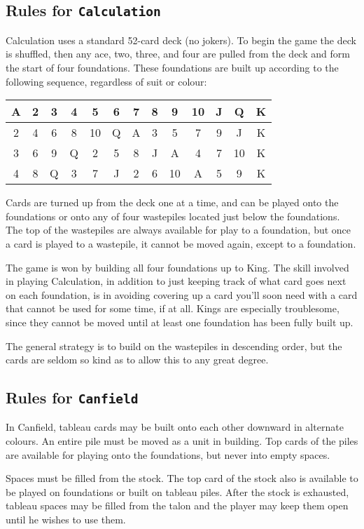 \subsection{Rules for {\tt Calculation}}
Calculation uses a standard 52-card deck (no jokers).
To begin the game the deck is shuffled, then any ace,
two, three, and four are pulled from the deck and form
the start of four foundations.  These foundations are
built up according to the following sequence,
regardless of suit or colour:

\smallskip
\begin{tabular}{|c|c|c|c|c|c|c|c|c|c|c|c|c|}
\hline
            A&2&3&4&5&6&7&8&9&10&J&Q&K\\
\hline
            2&4&6&8&10&Q&A&3&5&7&9&J&K\\
\hline
            3&6&9&Q&2&5&8&J&A&4&7&10&K\\
\hline
            4&8&Q&3&7&J&2&6&10&A&5&9&K\\
\hline
\end{tabular}

\smallskip
Cards are turned up from the deck one at a time, and
can be played onto the foundations or onto any of four
wastepiles located just below the foundations.  The
top of the wastepiles are always available for play to
a foundation, but once a card is played to a
wastepile, it cannot be moved again, except to a
foundation.

The game is won by building all four foundations up to
King.  The skill involved in playing Calculation, in
addition to just keeping track of what card goes next
on each foundation, is in avoiding covering up a card
you'll soon need with a card that cannot be used for
some time, if at all.  Kings are especially
troublesome, since they cannot be moved until at least
one foundation has been fully built up.

The general strategy is to build on the wastepiles in
descending order, but the cards are seldom so kind as
to allow this to any great degree.

\subsection{Rules for {\tt Canfield}}
In Canfield, tableau cards may be built onto each other
downward in alternate colours. An entire pile must be
moved as a unit in building. Top cards of the piles
are available for playing onto the foundations,
but never into empty spaces.

Spaces must be filled from the stock. The top card of
the stock also is available to be played on
foundations or built on tableau piles. After the stock
is exhausted, tableau spaces may be filled from the
talon and the player may keep them open until he
wishes to use them.

